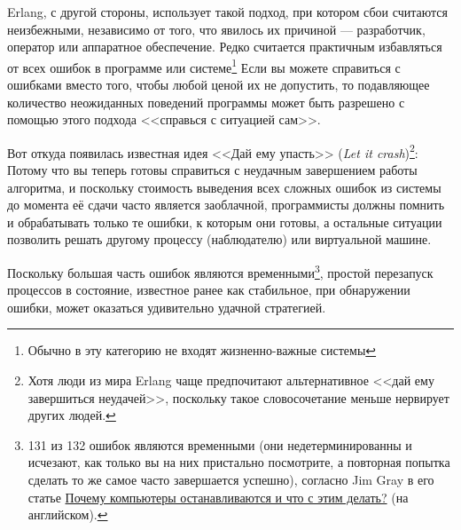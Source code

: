 \documentclass[11pt, oneside]{book}   	%
\begin{document}
Erlang, с другой стороны, использует такой подход, при котором сбои считаются неизбежными, независимо от того, что явилось их причиной --- разработчик, оператор или аппаратное обеспечение. Редко считается практичным избавляться от всех ошибок в программе или системе\footnote{Обычно в эту категорию не входят жизненно-важные системы} Если вы можете справиться с ошибками вместо того, чтобы любой ценой их не допустить, то подавляющее количество неожиданных поведений программы может быть разрешено с помощью этого подхода <<справься с ситуацией сам>>.

Вот откуда появилась известная идея <<Дай ему упасть>> (\emph{Let it crash})\footnote{Хотя люди из мира Erlang чаще предпочитают альтернативное <<дай ему завершиться неудачей>>, поскольку такое словосочетание меньше нервирует других людей.}: Потому что вы теперь готовы справиться с неудачным завершением работы алгоритма, и поскольку стоимость выведения всех сложных ошибок из системы до момента её сдачи часто является заоблачной, программисты должны помнить и обрабатывать только те ошибки, к которым они готовы, а остальные ситуации позволить решать другому процессу (наблюдателю) или виртуальной машине.

Поскольку большая часть ошибок являются временными\footnote{131 из 132 ошибок являются временными (они недетерминированны и исчезают, как только вы на них пристально посмотрите, а повторная попытка сделать то же самое часто завершается успешно), согласно Jim Gray в его статье \href{http://www.hpl.hp.com/techreports/tandem/TR-85.7.html}{Почему компьютеры останавливаются и что с этим делать?} (на английском).}, простой перезапуск процессов в состояние, известное ранее как стабильное, при обнаружении ошибки, может оказаться удивительно удачной стратегией.
\end{document}

